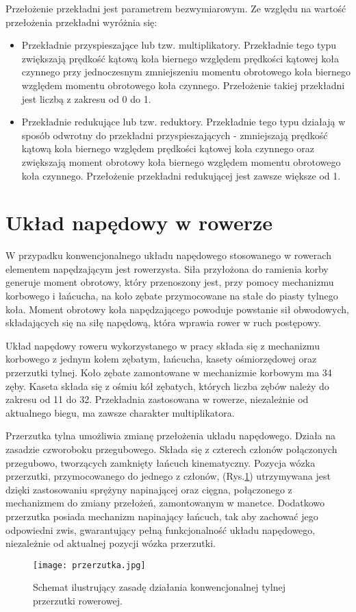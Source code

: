 Przełożenie przekładni jest parametrem bezwymiarowym. Ze względu na wartość przełożenia przekładni wyróżnia się:
\begin{itemize}
\item
Przekładnie przyspieszające lub tzw. multiplikatory. Przekładnie tego typu zwiększają prędkość kątową koła biernego względem prędkości kątowej koła czynnego przy jednoczesnym zmniejszeniu momentu obrotowego koła biernego względem momentu obrotowego koła czynnego. Przełożenie takiej przekładni jest liczbą z zakresu od 0 do 1.
\item
Przekładnie redukujące lub tzw. reduktory. Przekładnie tego typu działają w sposób odwrotny do przekładni przyspieszających - zmniejszają prędkość kątową koła biernego względem prędkości kątowej koła czynnego oraz zwiększają moment obrotowy koła biernego względem momentu obrotowego koła czynnego. Przełożenie przekładni redukującej jest zawsze większe od 1.
\end{itemize} 
\section{Układ napędowy w rowerze}
W przypadku konwencjonalnego układu napędowego stosowanego w rowerach elementem napędzającym jest rowerzysta. Siła przyłożona do ramienia korby generuje moment obrotowy, który przenoszony jest, przy pomocy mechanizmu korbowego i łańcucha, na koło zębate przymocowane na stałe do piasty tylnego koła. Moment obrotowy koła napędzającego powoduje powstanie sił obwodowych, składających się na siłę napędową, która wprawia rower w ruch postępowy.

Układ napędowy roweru wykorzystanego w pracy składa się z mechanizmu korbowego z jednym kołem zębatym, łańcucha, kasety ośmiorzędowej oraz przerzutki tylnej. Koło zębate zamontowane w mechanizmie korbowym ma 34 zęby. Kaseta składa się z ośmiu kół zębatych, których liczba zębów należy do zakresu od 11 do 32. Przekładnia zastosowana w rowerze, niezależnie od aktualnego biegu, ma zawsze charakter multiplikatora.

Przerzutka tylna umożliwia zmianę przełożenia układu napędowego. Działa na zasadzie czworoboku przegubowego. Składa się z czterech członów połączonych przegubowo, tworzących zamknięty łańcuch kinematyczny. Pozycja wózka przerzutki, przymocowanego do jednego z członów, (Rys.\ref{fig:przerzutka}) utrzymywana jest dzięki zastosowaniu sprężyny napinającej oraz cięgna, połączonego z mechanizmem do zmiany przełożeń, zamontowanym w manetce. Dodatkowo przerzutka posiada mechanizm napinający łańcuch, tak aby zachować jego odpowiedni zwis, gwarantujący pełną funkcjonalność układu napędowego, niezależnie od aktualnej pozycji wózka przerzutki. 
\begin{figure}[h]
    \centering
    \texttt{[image: przerzutka.jpg]}
    \caption{Schemat ilustrujący zasadę działania konwencjonalnej tylnej przerzutki rowerowej.}
    \label{fig:przerzutka}
\end{figure}
